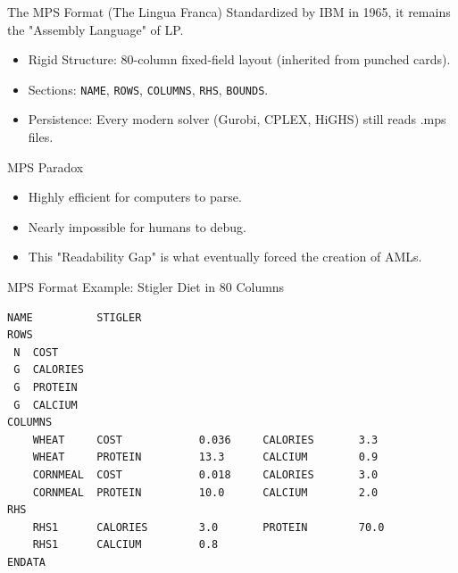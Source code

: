 \documentclass[presentation, aspectratio=169]{beamer}
\begin{document}
\begin{frame}[label={sec:org2a7336d},fragile]{The MPS Format (The Lingua Franca)}
 Standardized by IBM in 1965, it remains the "Assembly Language" of LP.
\begin{itemize}
\item \alert{\alert{Rigid Structure}}: 80-column fixed-field layout (inherited from punched cards).
\item \alert{\alert{Sections}}: \texttt{NAME}, \texttt{ROWS}, \texttt{COLUMNS}, \texttt{RHS}, \texttt{BOUNDS}.
\item \alert{\alert{Persistence}}: Every modern solver (Gurobi, CPLEX, HiGHS) still reads .mps files.
\end{itemize}

\begin{block}{MPS Paradox}
\begin{itemize}
\item Highly efficient for computers to parse.
\item Nearly impossible for humans to debug.
\item This "Readability Gap" is what eventually forced the creation of AMLs.
\end{itemize}
\end{block}
\end{frame}


\begin{frame}[label={sec:org358b6ed},fragile]{MPS Format}
 Example: Stigler Diet in 80 Columns

{\scriptsize
\begin{verbatim}
NAME          STIGLER
ROWS
 N  COST
 G  CALORIES
 G  PROTEIN
 G  CALCIUM
COLUMNS
    WHEAT     COST            0.036     CALORIES       3.3
    WHEAT     PROTEIN         13.3      CALCIUM        0.9
    CORNMEAL  COST            0.018     CALORIES       3.0
    CORNMEAL  PROTEIN         10.0      CALCIUM        2.0
RHS
    RHS1      CALORIES        3.0       PROTEIN        70.0
    RHS1      CALCIUM         0.8
ENDATA
\end{verbatim}
}
\end{frame}
\end{document}
